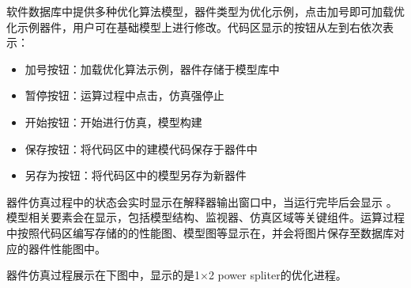 \documentclass[letterpaper,10pt,english]{sphinxmanual}
\begin{document}
{{\sphinxAtStartPar
{}





\sphinxAtStartPar
软件数据库中提供多种优化算法模型，器件类型为优化示例，点击加号即可加载优化示例器件，用户可在基础模型上进行修改。代码区显示的按钮从左到右依次表示：
\begin{itemize}
\item {} 
\sphinxAtStartPar
加号按钮：加载优化算法示例，器件存储于模型库中

\item {} 
\sphinxAtStartPar
暂停按钮：运算过程中点击，仿真强停止

\item {} 
\sphinxAtStartPar
开始按钮：开始进行仿真，模型构建

\item {} 
\sphinxAtStartPar
保存按钮：将代码区中的建模代码保存于器件中

\item {} 
\sphinxAtStartPar
另存为按钮：将代码区中的模型另存为新器件

\end{itemize}

\sphinxAtStartPar
器件仿真过程中的状态会实时显示在解释器输出窗口中，当运行完毕后会显示 。模型相关要素会在显示，包括模型结构、监视器、仿真区域等关键组件。运算过程中按照代码区编写存储的的性能图、模型图等显示在，并会将图片保存至数据库对应的器件性能图中。

\sphinxAtStartPar
器件仿真过程展示在下图中，显示的是1×2 power spliter的优化进程。


\sphinxAtStartPar
\sphinxincludegraphics{{软件模块介绍/优化算法/assets/%






\subsection{优化算法tips}
\label{\detokenize{_u8f6f_u4ef6_u6a21_u5757_u4ecb_u7ecd/_u4f18_u5316_u7b97_u6cd5/contents:tips}}
\sphinxAtStartPar
因软件还在开发阶段，用户搭建模型需按照已给定的实例进行改写，或者使用软件提供的API进行模型构建：
\begin{itemize}
\item {} 
\sphinxAtStartPar
用户需按照API规则进行模型构建，对于监视器、模型构建等关键建模语句需提供必要的参数等


\end{itemize}}}}}
\end{document}
